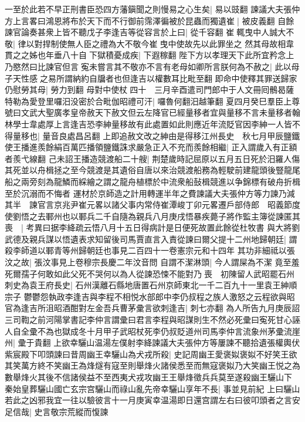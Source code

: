 一至於此若不早正刑書臣恐四方藩鎭聞之則慢易之心生矣|{
	易以豉翻}
諫議大夫張仲方上言畧曰鴻恩將布於天下而不行御前霈澤徧被於昆蟲而獨遺崔|{
	被皮義翻}
自餘諫官論奏甚衆上皆不聽戊子李逢吉等從容言於上曰|{
	從千容翻}
崔輒曳中人誠大不敬|{
	律以對捍制使無人臣之禮為大不敬今崔曳中使故先以此罪坐之}
然其母故相韋貫之之姊也年垂八十自下獄積憂成疾|{
	下遐稼翻}
陛下方以孝理天下此所宜矜念上乃愍然曰比諫官但言寃未嘗言其不敬亦不言有老母如卿所言朕何為不赦之|{
	此以母子天性感之易所謂納約自牖者也但逢吉以權數耳比毗至翻}
即命中使釋其罪送歸家仍慰勞其母|{
	勞力到翻}
母對中使杖四十　三月辛酉遣司門郎中于人文冊囘鶻曷薩特勒為愛登里囉汨没密於合毗伽昭禮可汗|{
	囉魯何翻汨越筆翻}
夏四月癸巳羣臣上尊號曰文武大聖廣孝皇帝赦天下赦文但云左降官已經量移者宜與量移不言未量移者翰林學士韋處厚上言逢吉恐李紳量移故有此處置如此則應近年流貶官因李紳一人皆不得量移也|{
	量音良處昌呂翻}
上即追赦文改之紳由是得移江州長史　秋七月甲辰鹽鐵使王播進羨餘絹百萬匹播領鹽鐵誅求嚴急正入不充而羨餘相繼|{
	正入謂歲入有正額者羨弋線翻}
己未詔王播造競渡船二十艘|{
	荆楚歲時記屈原以五月五日死於汨羅人傷其死並以舟楫拯之至今競渡是其遺俗自唐以來治競渡船務為輕駛前建龍頭後豎龍尾船之兩旁刻為龍鱗而綵繪之謂之龍舟植標於中流衆船鼔楫競進以争錦標有破舟折楫至於沉溺而不悔者}
運材於京師造之計用轉運半年之費諫議大夫張仲方等力諫乃減其半　諫官言京兆尹崔元畧以諸父事内常侍崔潭峻丁卯元畧遷戶部侍郎　昭義節度使劉悟之去鄆州也以鄆兵二千自隨為親兵八月庚戌悟暴疾薨子將作監主簿從諫匿其喪　|{
	考異曰据李絳疏云悟八月十五日得病計是日便死故置此餘從杜牧書}
與大將劉武德及親兵謀以悟遺表求知留後司馬賈直言入責從諫曰爾父提十二州地歸朝廷|{
	謂殺李師道以鄆青等州歸朝廷也事見二百四十一卷憲宗元和十四年}
其功非細祗以張汶之故|{
	張汶事見上卷穆宗長慶二年汶音問}
自謂不潔淋頭|{
	今人謂屎為不潔}
竟至羞死爾孺子何敢如此父死不哭何以為人從諫恐悚不能對乃喪　初陳留人武昭罷石州刺史為袁王府長史|{
	石州漢離石縣地唐置石州京師東北一千二百九十一里袁王紳順宗子}
鬱鬱怨執政李逢吉與李程不相悦水部郎中李仍叔程之族人激怒之云程欲與昭官為逢吉所沮昭酒酣對左金吾兵曹茅彚言欲刺逢吉|{
	刺七亦翻}
為人所告九月庚辰詔三司鞫之前河陽掌書記李仲言謂彚曰君言李程與昭謀則生不然必死彚曰寃死甘心誣人自全彚不為也獄成冬十月甲子武昭杖死李仍叔貶道州司馬李仲言流象州茅彚流崖州|{
	彚于貴翻}
上欲幸驪山温湯左僕射李絳諫議大夫張仲方等屢諫不聽拾遺張權輿伏紫宸殿下叩頭諫曰昔周幽王幸驪山為犬戎所殺|{
	史記周幽王愛褒姒褒姒不好笑王欲其笑萬方終不笑幽王為烽燧有寇至則舉烽火諸侯悉至而無寇褒姒乃大笑幽王悦之為數舉烽火其後不信諸侯益不至西夷犬戎攻幽王王舉烽徵兵兵莫至遂殺幽王驪山下}
秦始皇葬驪山國亡玄宗宫驪山而祿山亂先帝幸驪山享年不長|{
	事並見前紀}
上曰驪山若此之凶邪我宜一往以驗彼言十一月庚寅幸温湯即日還宫謂左右曰彼叩頭者之言安足信哉|{
	史言敬宗荒縱而愎諫}
